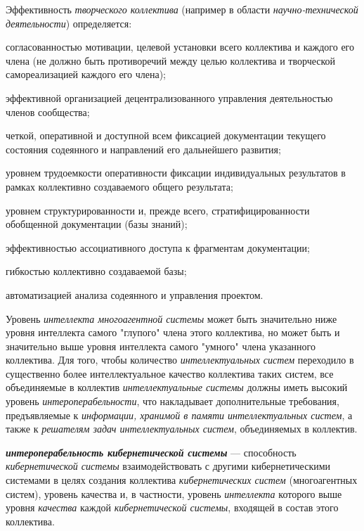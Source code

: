 Эффективность \textit{творческого коллектива} (например в области \textit{научно-технической деятельности}) определяется:
\begin{textitemize}
    \item согласованностью мотивации, целевой установки всего коллектива и каждого его члена (не должно быть противоречий между целью коллектива и творческой самореализацией каждого его члена);
    \item эффективной организацией децентрализованного управления деятельностью членов сообщества;
    \item четкой, оперативной и доступной всем фиксацией документации текущего состояния содеянного и направлений его дальнейшего развития;
    \item уровнем трудоемкости оперативности фиксации индивидуальных результатов в рамках коллективно создаваемого общего результата;
    \item уровнем структурированности и, прежде всего, стратифицированности обобщенной документации (базы знаний);
    \item эффективностью ассоциативного доступа к фрагментам документации;
    \item гибкостью коллективно создаваемой базы;
    \item автоматизацией анализа содеянного и управления проектом.
\end{textitemize}

Уровень \textit{интеллекта многоагентной системы} может быть значительно ниже уровня интеллекта самого "глупого"{} члена этого коллектива, но может быть и значительно выше уровня интеллекта самого "умного"{} члена указанного коллектива.
Для того, чтобы количество \textit{интеллектуальных систем} переходило в существенно более интеллектуальное качество коллектива таких систем, все объединяемые в коллектив \textit{интеллектуальные системы} должны иметь высокий уровень \textit{интероперабельности}, что накладывает дополнительные требования, предъявляемые к \textit{информации, хранимой в памяти интеллектуальных систем}, а также к \textit{решателям задач интеллектуальных систем}, объединяемых в коллектив.

\textbf{\textit{интероперабельность кибернетической системы}} --- способность \textit{кибернетической системы} взаимодействовать с другими кибернетическими системами в целях создания коллектива \textit{кибернетических систем} (многоагентных систем), уровень качества и, в частности, уровень \textit{интеллекта} которого выше уровня \textit{качества} каждой \textit{кибернетической системы}, входящей в состав этого коллектива.


